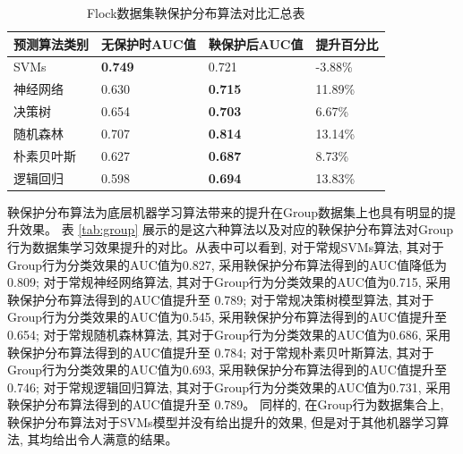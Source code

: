 \begin{table}[]
\centering
\caption{Flock数据集鞅保护分布算法对比汇总表}
\label{tab:flock}
\begin{tabular}{@{}llll@{}}
\toprule
预测算法类别 & 无保护时AUC值 & 鞅保护后AUC值 & 提升百分比 \\ \midrule
SVMs                 & \textbf{0.749}        & 0.721      		 & {-3.88\%}\\
神经网络       & 0.630                 & \textbf{0.715}      & {11.89\%}\\
决策树        & 0.654                 & \textbf{0.703}      & {6.67\%}\\
随机森林        & 0.707                 & \textbf{0.814}      & {13.14\%}\\
朴素贝叶斯     & 0.627                 & \textbf{0.687}      & {8.73\%}\\
逻辑回归  & 0.598                 & \textbf{0.694}      & {13.83\%}\\ \bottomrule
\end{tabular}
\end{table}

鞅保护分布算法为底层机器学习算法带来的提升在Group数据集上也具有明显的提升效果。 表 \ref{tab:group} 展示的是这六种算法以及对应的鞅保护分布算法对Group行为数据集学习效果提升的对比。从表中可以看到, 对于常规SVMs算法, 其对于Group行为分类效果的AUC值为0.827, 采用鞅保护分布算法得到的AUC值降低为 0.809; 对于常规神经网络算法, 其对于Group行为分类效果的AUC值为0.715, 采用鞅保护分布算法得到的AUC值提升至 0.789; 对于常规决策树模型算法, 其对于Group行为分类效果的AUC值为0.545, 采用鞅保护分布算法得到的AUC值提升至 0.654; 对于常规随机森林算法, 其对于Group行为分类效果的AUC值为0.686, 采用鞅保护分布算法得到的AUC值提升至 0.784; 对于常规朴素贝叶斯算法, 其对于Group行为分类效果的AUC值为0.693, 采用鞅保护分布算法得到的AUC值提升至 0.746; 对于常规逻辑回归算法, 其对于Group行为分类效果的AUC值为0.731, 采用鞅保护分布算法得到的AUC值提升至 0.789。 同样的, 在Group行为数据集合上, 鞅保护分布算法对于SVMs模型并没有给出提升的效果, 但是对于其他机器学习算法, 其均给出令人满意的结果。

